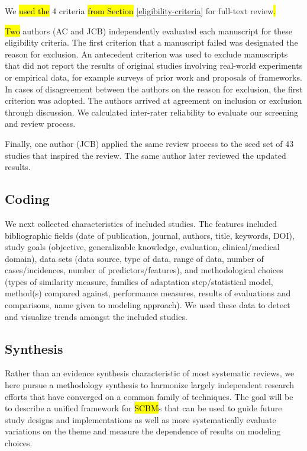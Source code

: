 \documentclass[sn-mathphys,Numbered,pdflatex]{sn-jnl}
\theoremstyle{remark}
\theoremstyle{definition}
\begin{document}
We \hl{used the} 4 criteria\hl{ from Section }\ref{eligibility-criteria}
for full-text review\hl{.}

\hl{Two} authors (AC and JCB) independently evaluated each manuscript
for these eligibility criteria. The first criterion that a manuscript
failed was designated the reason for exclusion. An antecedent criterion
was used to exclude manuscripts that did not report the results of
original studies involving real-world experiments or empirical data, for
example surveys of prior work and proposals of frameworks. In cases of
disagreement between the authors on the reason for exclusion, the first
criterion was adopted. The authors arrived at agreement on inclusion or
exclusion through discussion. We calculated inter-rater reliability to
evaluate our screening and review process.

Finally, one author (JCB) applied the same review process to the seed
set of 43 studies that inspired the review. The same author later
reviewed the updated results.

\subsection{Coding}\label{coding}

We next collected characteristics of included studies. The features
included bibliographic fields (date of publication, journal, authors,
title, keywords, DOI), study goals (objective, generalizable knowledge,
evaluation, clinical/medical domain), data sets (data source, type of
data, range of data, number of cases/incidences, number of
predictors/features), and methodological choices (types of similarity
measure, families of adaptation step/statistical model, method(s)
compared against, performance measures, results of evaluations and
comparisons, name given to modeling approach). We used these data to
detect and visualize trends amongst the included studies.

\subsection{Synthesis}\label{synthesis}

Rather than an evidence synthesis characteristic of most systematic
reviews, we here pursue a methodology synthesis to harmonize largely
independent research efforts that have converged on a common family of
techniques. The goal will be to describe a unified framework for
\hl{SCBM}s that can be used to guide future study designs and
implementations as well as more systematically evaluate variations on
the theme and measure the dependence of results on modeling choices.
\end{document}
